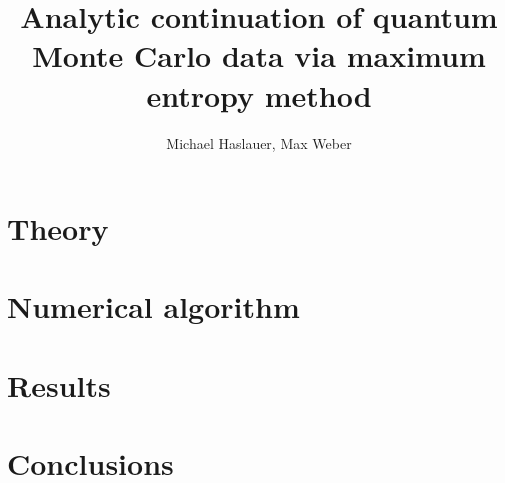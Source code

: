 \documentclass[10pt,letterpaper]{article}
\begin{document}
\title{Analytic continuation of quantum Monte Carlo data via maximum entropy method}
\author{Michael Haslauer, Max Weber}



\section{Theory} %
\label{sec:theory}

\section{Numerical algorithm} %
\label{sec:numerical_algorithm}

\section{Results} %
\label{sec:results}

\section{Conclusions} %
\label{sec:conclusions}
\end{document}
